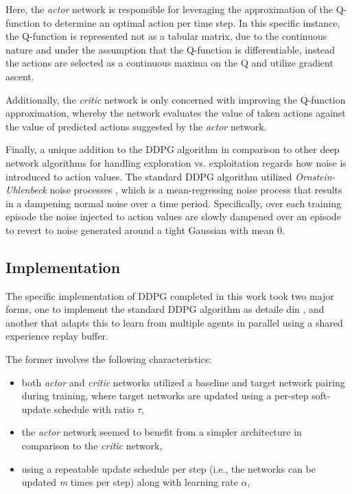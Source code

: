 \documentclass[11pt]{article}
\begin{document}
Here, the \textit{actor} network is responsible for leveraging the approximation of the Q-function to determine an optimal action per time step. In this specific instance, the Q-function is represented not as a tabular matrix, due to the continuous nature and under the assumption that the Q-function is differentiable, instead the actions are selected as a continuous maxima on the Q and utilize gradient ascent.

Additionally, the \textit{critic} network is only concerned with improving the Q-function approximation, whereby the network evaluates the value of taken actions against the value of predicted actions suggested by the \textit{actor} network.

Finally, a unique addition to the DDPG algorithm in comparison to other deep network algorithms for handling exploration vs. exploitation regards how noise is introduced to action values. The standard DDPG algorithm utilized \textit{Ornstein-Uhlenbeck} noise processes \cite{ddpg}, which is a mean-regressing noise process that results in a dampening normal noise over a time period. Specifically, over each training episode the noise injected to action values are slowly dampened over an episode to revert to noise generated around a tight Gaussian with mean 0.

\subsection{Implementation}

The specific implementation of DDPG completed in this work took two major forms, one to implement the standard DDPG algorithm as detaile din \cite{ddpg}, and another that adapts this to learn from multiple agents in parallel using a shared experience replay buffer.

The former involves the following characteristics:
\begin{itemize}
	\item both \textit{actor} and \textit{critic} networks utilized a baseline and target network pairing during training, where target networks are updated using a per-step soft-update schedule with ratio $\tau$,
	\item the \textit{actor} network seemed to benefit from a simpler architecture in comparison to the \textit{critic} network,
	\item using a repeatable update schedule per step (i.e., the networks can be updated \textit{m} times per step) along with learning rate $\alpha$,
\end{itemize}
\end{document}
